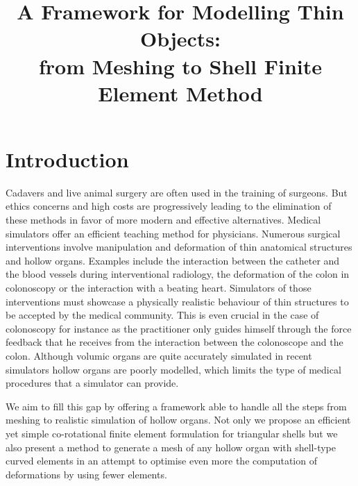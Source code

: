 \documentclass{llncs}
\begin{document}
\title{A Framework for Modelling Thin Objects: \\ from Meshing to Shell Finite Element Method}

\maketitle

\begin{abstract}

\end{abstract}

\section{Introduction}
Cadavers and live animal surgery are often used in the training of surgeons. But ethics concerns and high costs are progressively leading to the elimination of these methods in favor of more modern and effective alternatives. Medical simulators offer an efficient teaching method for physicians. Numerous surgical interventions involve manipulation and deformation of thin anatomical structures and hollow organs. Examples include the interaction between the catheter and the blood vessels during interventional radiology, the deformation of the colon in colonoscopy or the interaction with a beating heart. Simulators of those interventions must showcase a physically realistic behaviour of thin structures to be accepted by the medical community. This is even crucial in the case of colonoscopy for instance as the practitioner only guides himself through the force feedback that he receives from the interaction between the colonoscope and the colon. Although volumic organs are quite accurately simulated in recent simulators hollow organs are poorly modelled, which limits the type of medical procedures that a simulator can provide. 

We aim to fill this gap by offering a framework able to handle all the steps from meshing to realistic simulation of hollow organs. Not only we propose an efficient yet simple co-rotational finite element formulation for triangular shells but we also present a method to generate a mesh of any hollow organ with shell-type curved elements in an attempt to optimise even more the computation of deformations by using fewer elements. %
\end{document}
